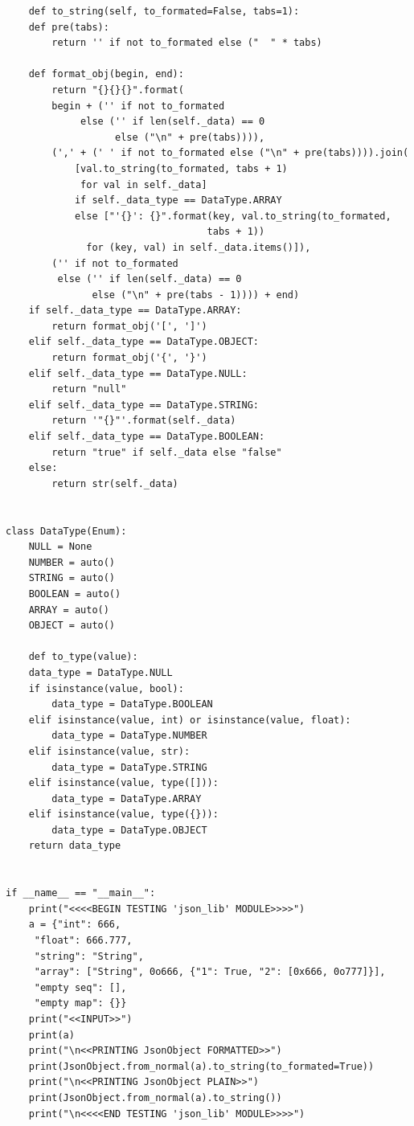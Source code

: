 \documentclass[11pt]{article}
\begin{document}
\begin{lstlisting}
    def to_string(self, to_formated=False, tabs=1):
	def pre(tabs):
	    return '' if not to_formated else ("  " * tabs)

	def format_obj(begin, end):
	    return "{}{}{}".format(
		begin + ('' if not to_formated
			 else ('' if len(self._data) == 0
			       else ("\n" + pre(tabs)))),
		(',' + (' ' if not to_formated else ("\n" + pre(tabs)))).join(
		    [val.to_string(to_formated, tabs + 1)
		     for val in self._data]
		    if self._data_type == DataType.ARRAY
		    else ["'{}': {}".format(key, val.to_string(to_formated,
							       tabs + 1))
			  for (key, val) in self._data.items()]),
		('' if not to_formated
		 else ('' if len(self._data) == 0
		       else ("\n" + pre(tabs - 1)))) + end)
	if self._data_type == DataType.ARRAY:
	    return format_obj('[', ']')
	elif self._data_type == DataType.OBJECT:
	    return format_obj('{', '}')
	elif self._data_type == DataType.NULL:
	    return "null"
	elif self._data_type == DataType.STRING:
	    return '"{}"'.format(self._data)
	elif self._data_type == DataType.BOOLEAN:
	    return "true" if self._data else "false"
	else:
	    return str(self._data)


class DataType(Enum):
    NULL = None
    NUMBER = auto()
    STRING = auto()
    BOOLEAN = auto()
    ARRAY = auto()
    OBJECT = auto()

    def to_type(value):
	data_type = DataType.NULL
	if isinstance(value, bool):
	    data_type = DataType.BOOLEAN
	elif isinstance(value, int) or isinstance(value, float):
	    data_type = DataType.NUMBER
	elif isinstance(value, str):
	    data_type = DataType.STRING
	elif isinstance(value, type([])):
	    data_type = DataType.ARRAY
	elif isinstance(value, type({})):
	    data_type = DataType.OBJECT
	return data_type


if __name__ == "__main__":
    print("<<<<BEGIN TESTING 'json_lib' MODULE>>>>")
    a = {"int": 666,
	 "float": 666.777,
	 "string": "String",
	 "array": ["String", 0o666, {"1": True, "2": [0x666, 0o777]}],
	 "empty seq": [],
	 "empty map": {}}
    print("<<INPUT>>")
    print(a)
    print("\n<<PRINTING JsonObject FORMATTED>>")
    print(JsonObject.from_normal(a).to_string(to_formated=True))
    print("\n<<PRINTING JsonObject PLAIN>>")
    print(JsonObject.from_normal(a).to_string())
    print("\n<<<<END TESTING 'json_lib' MODULE>>>>")
\end{lstlisting}
\end{document}
